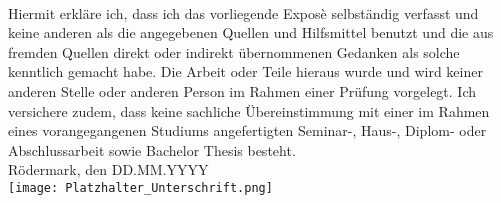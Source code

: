 \\
Hiermit erkläre ich, dass ich das vorliegende Exposè selbständig verfasst und keine anderen als die angegebenen Quellen und Hilfsmittel benutzt und die aus fremden Quellen direkt oder indirekt übernommenen Gedanken als solche kenntlich gemacht habe. Die Arbeit oder Teile hieraus wurde und wird keiner anderen Stelle oder anderen Person im Rahmen einer Prüfung vorgelegt. Ich versichere zudem, dass keine sachliche Übereinstimmung mit einer im Rahmen eines vorangegangenen Studiums angefertigten Seminar-, Haus-, Diplom- oder Abschlussarbeit sowie Bachelor Thesis besteht.
\\ [1.2em]
Rödermark, den DD.MM.YYYY%
\\ [1.2em]
\texttt{[image: Platzhalter\_Unterschrift.png]}%